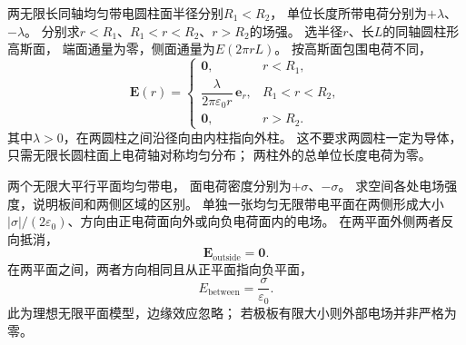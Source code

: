 \problemtext 两无限长同轴均匀带电圆柱面半径分别$R_1<R_2$，
单位长度所带电荷分别为$+\lambda$、$-\lambda$。
分别求$r<R_1$、$R_1<r<R_2$、$r>R_2$的场强。
\workings
选半径$r$、长$L$的同轴圆柱形高斯面，
端面通量为零，侧面通量为$E(2\pi rL)$。
按高斯面包围电荷不同，
\[
\boxed{\bm E(r)=
\begin{cases}
\bm0,&r<R_1,\\
\dfrac{\lambda}{2\pi\varepsilon_0 r}\,\bm e_r,&R_1<r<R_2,\\
\bm0,&r>R_2.
\end{cases}}
\]
其中$\lambda>0$，在两圆柱之间沿径向由内柱指向外柱。
\crosscheck 这不要求两圆柱一定为导体，只需无限长圆柱面上电荷轴对称均匀分布；
两柱外的总单位长度电荷为零。

\problemtext 两个无限大平行平面均匀带电，
面电荷密度分别为$+\sigma$、$-\sigma$。
求空间各处电场强度，说明板间和两侧区域的区别。
\workings
单独一张均匀无限带电平面在两侧形成大小
$|\sigma|/(2\varepsilon_0)$、方向由正电荷面向外或向负电荷面内的电场。
在两平面外侧两者反向抵消，
\[
\boxed{\bm E_{\mathrm{outside}}=\bm0}.
\]
在两平面之间，两者方向相同且从正平面指向负平面，
\[
\boxed{E_{\mathrm{between}}=\frac{\sigma}{\varepsilon_0}}.
\]
\crosscheck 此为理想无限平面模型，边缘效应忽略；
若极板有限大小则外部电场并非严格为零。
